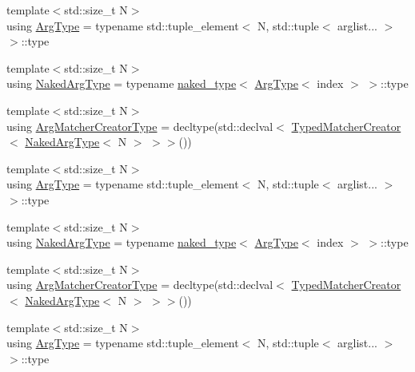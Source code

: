 \begin{DoxyCompactItemize}
\item 
{\footnotesize template$<$std\+::size\+\_\+t N$>$ }\\using \mbox{\hyperlink{classfakeit_1_1MatchersCollector_aaba0fca8c182a698dda8ca056c29fe5f}{Arg\+Type}} = typename std\+::tuple\+\_\+element$<$ N, std\+::tuple$<$ arglist... $>$ $>$\+::type
\item 
{\footnotesize template$<$std\+::size\+\_\+t N$>$ }\\using \mbox{\hyperlink{classfakeit_1_1MatchersCollector_aeda8ced6a2f0cb7c6e4f916f18a91730}{Naked\+Arg\+Type}} = typename \mbox{\hyperlink{structfakeit_1_1naked__type}{naked\+\_\+type}}$<$ \mbox{\hyperlink{classfakeit_1_1MatchersCollector_aaba0fca8c182a698dda8ca056c29fe5f}{Arg\+Type}}$<$ index $>$ $>$\+::type
\item 
{\footnotesize template$<$std\+::size\+\_\+t N$>$ }\\using \mbox{\hyperlink{classfakeit_1_1MatchersCollector_a1b9d32a66882e0559e7072f1db88eee3}{Arg\+Matcher\+Creator\+Type}} = decltype(std\+::declval$<$ \mbox{\hyperlink{structfakeit_1_1TypedMatcherCreator}{Typed\+Matcher\+Creator}}$<$ \mbox{\hyperlink{classfakeit_1_1MatchersCollector_aeda8ced6a2f0cb7c6e4f916f18a91730}{Naked\+Arg\+Type}}$<$ N $>$ $>$$>$())
\item 
{\footnotesize template$<$std\+::size\+\_\+t N$>$ }\\using \mbox{\hyperlink{classfakeit_1_1MatchersCollector_aaba0fca8c182a698dda8ca056c29fe5f}{Arg\+Type}} = typename std\+::tuple\+\_\+element$<$ N, std\+::tuple$<$ arglist... $>$ $>$\+::type
\item 
{\footnotesize template$<$std\+::size\+\_\+t N$>$ }\\using \mbox{\hyperlink{classfakeit_1_1MatchersCollector_aeda8ced6a2f0cb7c6e4f916f18a91730}{Naked\+Arg\+Type}} = typename \mbox{\hyperlink{structfakeit_1_1naked__type}{naked\+\_\+type}}$<$ \mbox{\hyperlink{classfakeit_1_1MatchersCollector_aaba0fca8c182a698dda8ca056c29fe5f}{Arg\+Type}}$<$ index $>$ $>$\+::type
\item 
{\footnotesize template$<$std\+::size\+\_\+t N$>$ }\\using \mbox{\hyperlink{classfakeit_1_1MatchersCollector_a1b9d32a66882e0559e7072f1db88eee3}{Arg\+Matcher\+Creator\+Type}} = decltype(std\+::declval$<$ \mbox{\hyperlink{structfakeit_1_1TypedMatcherCreator}{Typed\+Matcher\+Creator}}$<$ \mbox{\hyperlink{classfakeit_1_1MatchersCollector_aeda8ced6a2f0cb7c6e4f916f18a91730}{Naked\+Arg\+Type}}$<$ N $>$ $>$$>$())
\item 
{\footnotesize template$<$std\+::size\+\_\+t N$>$ }\\using \mbox{\hyperlink{classfakeit_1_1MatchersCollector_aaba0fca8c182a698dda8ca056c29fe5f}{Arg\+Type}} = typename std\+::tuple\+\_\+element$<$ N, std\+::tuple$<$ arglist... $>$ $>$\+::type

\end{DoxyCompactItemize}
